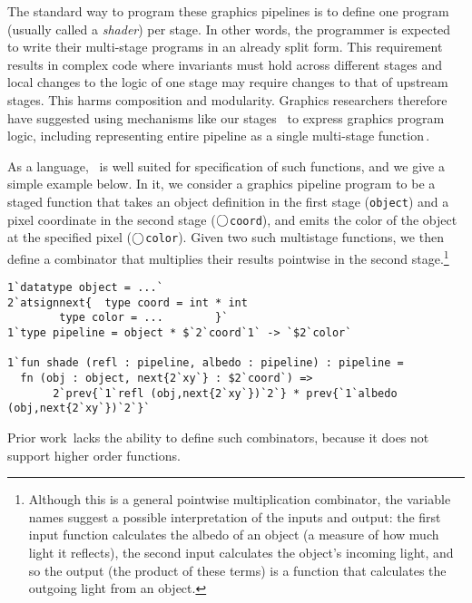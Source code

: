The standard way to program these graphics pipelines is 
to define one program (usually called a \emph{shader}) per stage.
In other words, the programmer is expected to write their 
multi-stage programs in an already split form.
This requirement results in complex code where invariants must hold across different stages and
local changes to the logic of one stage may require changes to that of upstream stages. 
This harms composition and modularity.  
Graphics researchers therefore have suggested using mechanisms like our stages
\,\cite{Proudfoot:2001,Foley:2011,He:2014} to express graphics program logic,
including representing entire pipeline as a single multi-stage function\,\cite{Foley:2011}.

As a language, \lang\ is well suited for specification of such functions,
and we give a simple example below.
In it, we consider a graphics pipeline program to be a
staged function that takes an object definition in the first stage (\texttt{object})
and a pixel coordinate in the second stage ($\bigcirc$\texttt{coord}), 
and emits the color of the object at the specified pixel ($\bigcirc$\texttt{color}). 
Given two such multistage functions, we then define a combinator
that multiplies their results pointwise in the second 
stage.\footnote{Although this is a general pointwise multiplication combinator, 
the variable names suggest a possible interpretation of the inputs and output:
the first input function calculates the albedo of an object (a measure of how much light it reflects),
the second input calculates the object's incoming light,
and so the output (the product of these terms) is a function that calculates 
the outgoing light from an object.}
%
\begin{lstlisting} 
1`datatype object = ...`
2`atsignnext{  type coord = int * int
        type color = ...        }`
1`type pipeline = object * $`2`coord`1` -> `$2`color`

1`fun shade (refl : pipeline, albedo : pipeline) : pipeline =
  fn (obj : object, next{2`xy`} : $2`coord`) =>
       2`prev{`1`refl (obj,next{2`xy`})`2`} * prev{`1`albedo (obj,next{2`xy`})`2`}`
\end{lstlisting}
%
Prior work\,\cite{Foley:2011} lacks the ability to define such combinators,
because it does not support higher order functions.